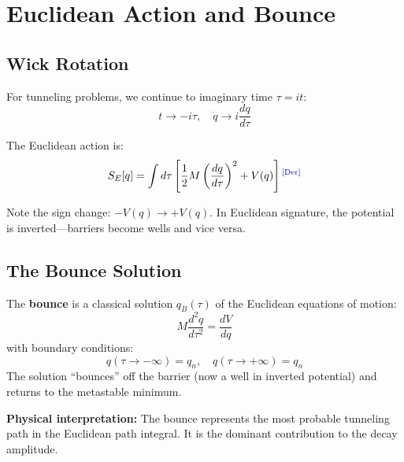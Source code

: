 \section{Euclidean Action and Bounce}
\label{sec:instanton:bounce}

\subsection{Wick Rotation}

For tunneling problems, we continue to imaginary time $\tau = it$:
\begin{equation}
    t \to -i\tau, \quad \dot{q} \to i \frac{dq}{d\tau}
\end{equation}

The Euclidean action is:
\begin{equation}
    \SE[q] = \int d\tau \left[ \frac{1}{2} M \left(\frac{dq}{d\tau}\right)^2 + V(q) \right]
    \label{eq:SE_integral}
    \tagDer
\end{equation}

Note the sign change: $-V(q) \to +V(q)$. In Euclidean signature, the potential
is inverted---barriers become wells and vice versa.

\subsection{The Bounce Solution}

\begin{derivationbox}[title=Bounce Definition]
    The \textbf{bounce} is a classical solution $q_B(\tau)$ of the Euclidean
    equations of motion:
    \begin{equation}
        M \frac{d^2 q}{d\tau^2} = \frac{dV}{dq}
        \label{eq:euclidean_eom}
    \end{equation}
    with boundary conditions:
    \begin{equation}
        q(\tau \to -\infty) = q_n, \quad q(\tau \to +\infty) = q_n
        \label{eq:bounce_bc}
    \end{equation}
    The solution ``bounces'' off the barrier (now a well in inverted potential)
    and returns to the metastable minimum.
    \tagDer
\end{derivationbox}

\textbf{Physical interpretation:} The bounce represents the most probable
tunneling path in the Euclidean path integral. It is the dominant contribution
to the decay amplitude.

